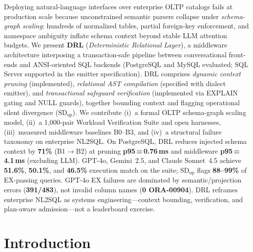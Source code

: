 \documentclass[twocolumn]{svjour3}
\begin{document}
Deploying natural-language interfaces over enterprise OLTP catalogs fails at production scale because unconstrained semantic parsers collapse under \emph{schema-graph scaling}: hundreds of normalized tables, partial foreign-key enforcement, and namespace ambiguity inflate schema context beyond stable LLM attention budgets.
We present \textbf{DRL} (\emph{Deterministic Relational Layer}), a middleware architecture interposing a transaction-safe pipeline between conversational front-ends and ANSI-oriented SQL backends (PostgreSQL and MySQL evaluated; SQL Server supported in the emitter specification).
DRL comprises \emph{dynamic context pruning} (implemented), \emph{relational AST compilation} (specified with dialect emitter), and \emph{transactional safeguard verification} (implemented via EXPLAIN gating and NULL guards), together bounding context and flagging operational silent divergence ($\text{SD}_{\text{op}}$).
We contribute (i)~a formal OLTP schema-graph scaling model, (ii)~a 1{,}000-pair Workload Verification Suite and open harnesses, (iii)~measured middleware baselines B0--B3, and (iv)~a structural failure taxonomy on enterprise NL2SQL.
On PostgreSQL, DRL reduces injected schema context by \textbf{71\%} (B1$\rightarrow$B2) at pruning \textbf{p95\,=\,0.76\,ms} and middleware \textbf{p95\,=\,4.1\,ms} (excluding LLM).
GPT-4o, Gemini~2.5, and Claude Sonnet~4.5 achieve \textbf{51.6\%}, \textbf{50.1\%}, and \textbf{46.5\%} execution match on the suite; $\text{SD}_{\text{op}}$ flags \textbf{88--99\%} of EX-passing queries.
GPT-4o EX failures are dominated by semantic/projection errors (\textbf{391/483}), not invalid column names (\textbf{0 ORA-00904}).
DRL reframes enterprise NL2SQL as systems engineering---context bounding, verification, and plan-aware admission---not a leaderboard exercise.


\section{Introduction}
\label{sec:intro}
\end{document}
